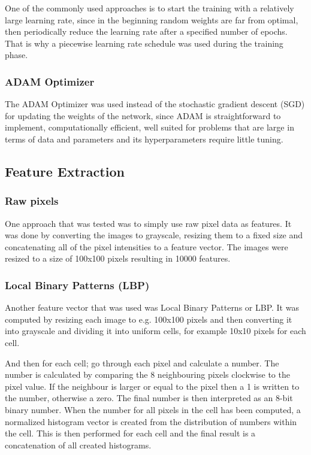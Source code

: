 \documentclass[doc/report.tex]{subfiles}
\begin{document}
One of the commonly used approaches is to start the training with a relatively large learning rate, since in the beginning random weights are far from optimal, then periodically reduce the learning rate after a specified number of epochs. That is why a piecewise learning rate schedule was used during the training phase.

\subsubsection{ADAM Optimizer}
The ADAM Optimizer was used instead of the stochastic gradient descent (SGD) for updating the weights of the network, since ADAM is straightforward to implement, computationally efficient, well suited for problems that are large in terms of data and parameters and its hyperparameters require little tuning.
\subsection{Feature Extraction}

\subsubsection{Raw pixels}
One approach that was tested was to simply use raw pixel data as features. It
was done by converting the images to grayscale, resizing them to a fixed size
and concatenating all of the pixel intensities to a feature vector. The images
were resized to a size of 100x100 pixels resulting in 10000 features.

\subsubsection{Local Binary Patterns (LBP)}
Another feature vector that was used was Local Binary Patterns or LBP. It was
computed by resizing each image to e.g. 100x100 pixels and then converting it
into grayscale and dividing it into uniform cells, for example 10x10 pixels for
each cell.

And then for each cell; go through each pixel and calculate a number. The
number is calculated by comparing the 8 neighbouring pixels clockwise to the
pixel value. If the neighbour is larger or equal to the pixel then a 1 is
written to the number, otherwise a zero. The final number is then interpreted
as an 8-bit binary number. When the number for all pixels in the cell has been
computed, a normalized histogram vector is created from the distribution of
numbers within the cell. This is then performed for each cell and the final
result is a concatenation of all created histograms.
\end{document}
